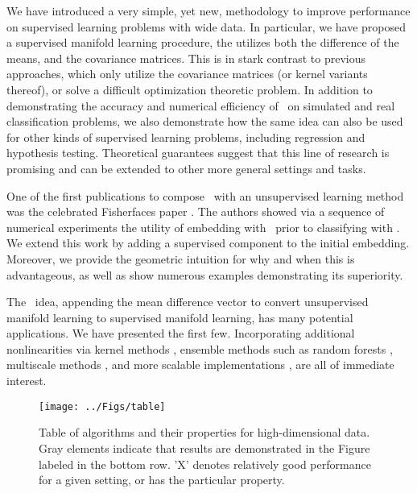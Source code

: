 \documentclass[10pt]{article}
\begin{document}
We have introduced a very simple, yet new, methodology to improve performance on supervised learning problems with wide data.  In particular, we have proposed a supervised manifold learning procedure, the utilizes both the difference of the means, and the covariance matrices.  This is in stark contrast to previous approaches, which only utilize the covariance matrices (or kernel variants thereof), or solve a difficult optimization theoretic problem.  In addition to demonstrating the accuracy and numerical efficiency of \Lol~on simulated and real classification problems, we also demonstrate how the same idea can also be used for other kinds of supervised learning problems, including regression and hypothesis testing. Theoretical guarantees suggest that this line of research is promising and can be extended to other more general settings and tasks.

One of the first publications to compose \Fld~with an unsupervised learning method was the celebrated Fisherfaces paper \cite{Belhumeur1997a}.  The authors showed via a sequence of numerical experiments the utility of embedding with \Pca~prior to classifying with \Fld.  We extend this work by adding a supervised component to the initial embedding.  Moreover, we provide the geometric intuition for why and when this is advantageous, as well as show numerous examples demonstrating its superiority.  %


The \Lol~idea, appending the mean difference vector to convert unsupervised manifold learning to supervised manifold learning, has many potential applications.  We have presented the first few.  Incorporating additional nonlinearities via kernel methods \cite{Mika1999a}, ensemble methods such as random forests \cite{Breiman2001a}, multiscale methods \cite{Allard2012},  and more scalable implementations \cite{Chang2011a}, are all of immediate interest.


\clearpage

\begin{figure}
\centering
\texttt{[image: ../Figs/table]} %
\caption{Table of algorithms and their properties for high-dimensional data. Gray elements indicate that results are demonstrated in the Figure labeled in the bottom row. 'X' denotes relatively good performance for a given setting, or has the particular property.
}
\label{f:table}
\end{figure}
\end{document}
